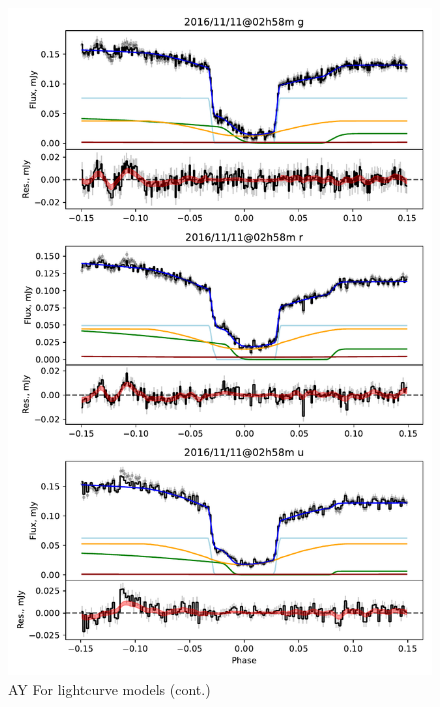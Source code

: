 \begin{figure}
    \centering
    \includegraphics[width=\textwidth]{figures/results/AYFor/AYFor_3.pdf}
    \caption{AY For lightcurve models (cont.)}
    \label{fig:AYFor all lightcurves cont 2}
\end{figure}



